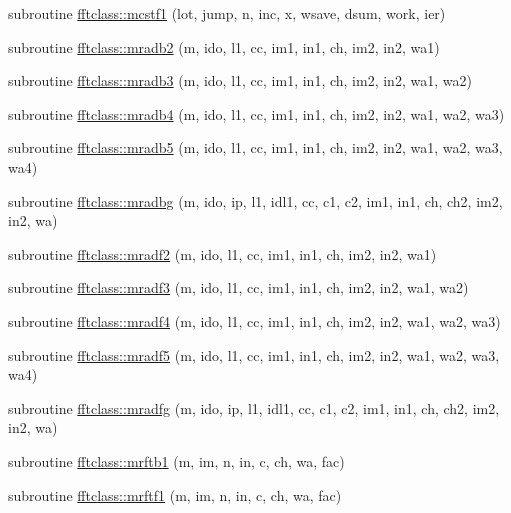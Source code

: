 \begin{DoxyCompactItemize}
\item 
subroutine \mbox{\hyperlink{namespacefftclass_aac5cdc09f4e9979eb972972e1db55cb3}{fftclass\+::mcstf1}} (lot, jump, n, inc, x, wsave, dsum, work, ier)
\item 
subroutine \mbox{\hyperlink{namespacefftclass_a39691ebdf781bf380b7ef426f4027896}{fftclass\+::mradb2}} (m, ido, l1, cc, im1, in1, ch, im2, in2, wa1)
\item 
subroutine \mbox{\hyperlink{namespacefftclass_a493cf432cfe190657e9a56a0d452b275}{fftclass\+::mradb3}} (m, ido, l1, cc, im1, in1, ch, im2, in2, wa1, wa2)
\item 
subroutine \mbox{\hyperlink{namespacefftclass_a5aae50728c25b5089b6b3c61d3ef27eb}{fftclass\+::mradb4}} (m, ido, l1, cc, im1, in1, ch, im2, in2, wa1, wa2, wa3)
\item 
subroutine \mbox{\hyperlink{namespacefftclass_a69781205c1568e37470a06e001a0dae7}{fftclass\+::mradb5}} (m, ido, l1, cc, im1, in1, ch, im2, in2, wa1, wa2, wa3, wa4)
\item 
subroutine \mbox{\hyperlink{namespacefftclass_ae156d4969bbcc9250a0dc81ee91d3cdf}{fftclass\+::mradbg}} (m, ido, ip, l1, idl1, cc, c1, c2, im1, in1, ch, ch2, im2, in2, wa)
\item 
subroutine \mbox{\hyperlink{namespacefftclass_a577b893eadc27ccc53b888490cb1b873}{fftclass\+::mradf2}} (m, ido, l1, cc, im1, in1, ch, im2, in2, wa1)
\item 
subroutine \mbox{\hyperlink{namespacefftclass_a4e99b7194e96b9a086f743a98205cc5a}{fftclass\+::mradf3}} (m, ido, l1, cc, im1, in1, ch, im2, in2, wa1, wa2)
\item 
subroutine \mbox{\hyperlink{namespacefftclass_aec86b95620b11b4db180468a4f771842}{fftclass\+::mradf4}} (m, ido, l1, cc, im1, in1, ch, im2, in2, wa1, wa2, wa3)
\item 
subroutine \mbox{\hyperlink{namespacefftclass_ab6d74e30932fcf82744ac339de050933}{fftclass\+::mradf5}} (m, ido, l1, cc, im1, in1, ch, im2, in2, wa1, wa2, wa3, wa4)
\item 
subroutine \mbox{\hyperlink{namespacefftclass_a5741ec7db9519828a0c46df4355b734d}{fftclass\+::mradfg}} (m, ido, ip, l1, idl1, cc, c1, c2, im1, in1, ch, ch2, im2, in2, wa)
\item 
subroutine \mbox{\hyperlink{namespacefftclass_a025f68a6ddd573ad3fa337835b621d3c}{fftclass\+::mrftb1}} (m, im, n, in, c, ch, wa, fac)
\item 
subroutine \mbox{\hyperlink{namespacefftclass_a5b17cd46c9d021ed6dfe9499fc802b3f}{fftclass\+::mrftf1}} (m, im, n, in, c, ch, wa, fac)

\end{DoxyCompactItemize}
